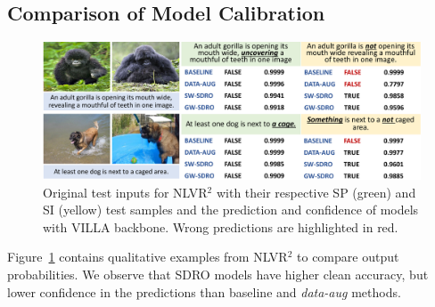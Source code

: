 \subsection{Comparison of Model Calibration}
\begin{figure}
    \centering
    \includegraphics[width=\linewidth]{sdro/images/predictions_qualitative_2.pdf}
    \caption{
    Original test inputs for NLVR$^2$ with their respective SP (green) and SI (yellow) test samples and the prediction and confidence of models with VILLA backbone.
    Wrong predictions are highlighted in red.
    }
    \label{fig:qualitative}
\end{figure}
Figure~\ref{fig:qualitative} contains qualitative examples from NLVR$^2$ to compare output probabilities.
We observe that SDRO models have higher clean accuracy, but lower confidence in the predictions than baseline and \textit{data-aug} methods.
